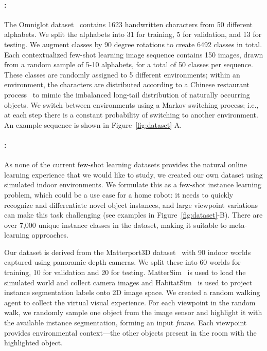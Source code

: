 \vspace{-0.1in}
\paragraph{\ourchar{}:}
The Omniglot dataset~\citep{omniglot} contains 1623 handwritten characters from 50 different
alphabets. We split the alphabets into 31 for training, 5 for validation, and 13 for testing. We
augment classes by 90 degree rotations to create 6492 classes in total. Each contextualized few-shot
learning image sequence contains 150 images, drawn from a random sample of 5-10 alphabets, for a
total of 50 classes per sequence. These classes are randomly assigned to 5 different environments;
within an environment, the characters are distributed according to a Chinese restaurant
process~\citep{crp} to mimic the imbalanced long-tail distribution of naturally occurring objects. We
switch between environments using a Markov switching process; i.e., at each step there is a constant
probability of switching to another environment. An example sequence is shown in
Figure~\ref{fig:dataset}-A.

\vspace{-0.1in}
\paragraph{\ourroom{}:}
As none of the current few-shot learning datasets provides the natural online learning experience
that we would like to study, we created our own dataset using simulated indoor environments. We
formulate this as a few-shot instance learning problem, which could be a use case for a home robot:
it needs to quickly recognize and differentiate novel object instances, and large viewpoint
variations can make this task challenging (see examples in Figure~\ref{fig:dataset}-B). There are
over 7,000 unique instance classes in the dataset, making it suitable to meta-learning approaches.

Our dataset is derived from the Matterport3D dataset~\citep{matterport} with 90 indoor worlds
captured using panoramic depth cameras. We split these into 60 worlds for training, 10 for
validation and 20 for testing. MatterSim~\citep{mattersim} is used to load the simulated world and
collect camera images and HabitatSim~\citep{habitat} is used to project instance
segmentation labels onto 2D image space. We created a random walking agent to collect the virtual
visual experience. For each viewpoint in the random walk, we randomly sample one object from
the image sensor and highlight it with the available instance segmentation, forming an input {\it
frame}. Each viewpoint provides environmental context---the other objects present in the
room with the highlighted object.

